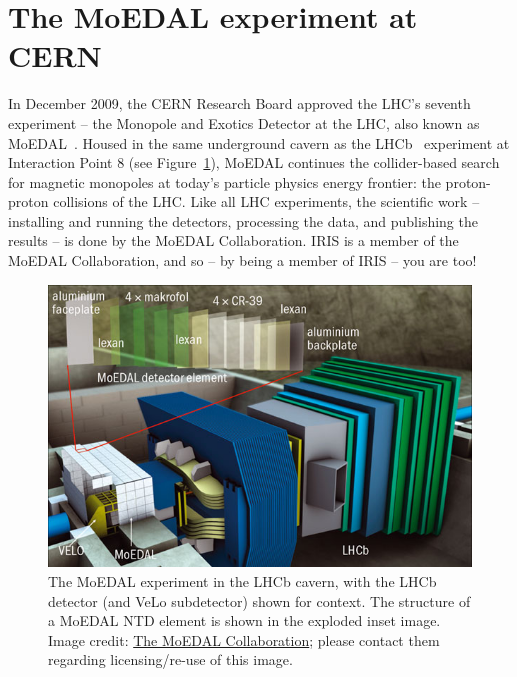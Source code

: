 \section{The MoEDAL experiment at CERN}
\label{sec:exp}
In December 2009, the CERN Research Board approved the
\acs{LHC}'s seventh experiment -- the
Monopole and Exotics Detector at the LHC,
also known as \acs{MoEDAL}~\cite{MoEDAL2009}.
%
Housed in the same underground cavern as
the \acs{LHCb}~\cite{LHCb2008} experiment at
Interaction Point 8 (see Figure~\ref{fig:moedallhcbsim}),
\ac{MoEDAL} continues the collider-based search for magnetic monopoles
at today's particle physics energy frontier:
the proton-proton collisions of the \ac{LHC}.
Like all \ac{LHC} experiments,
the scientific work -- installing and running the detectors,
processing the data, and publishing the results -- is done by the
\ac{MoEDAL} Collaboration.
\acs{IRIS} is a member of the \ac{MoEDAL} Collaboration,
and so -- by being a member of \ac{IRIS} -- you are too!

%
\begin{figure}[htbp]
  \centering
  \includegraphics[width=1.0\textwidth]{assets/images/moedallhcbsim/moedallhcbsim.jpg}
  \caption[The MoEDAL experiment in the LHCb cavern]
  {\label{fig:moedallhcbsim}The \ac{MoEDAL} experiment in the \ac{LHCb} %
cavern, with the \ac{LHCb} detector (and \ac{VeLo} subdetector) shown for %
context.  The structure of a \ac{MoEDAL} \acf{NTD} element is shown %
in the exploded inset image. Image credit: \href{http://moedal.web.cern.ch}{The MoEDAL Collaboration}; %
please contact them regarding licensing/re-use of this image.}
\end{figure}
%

